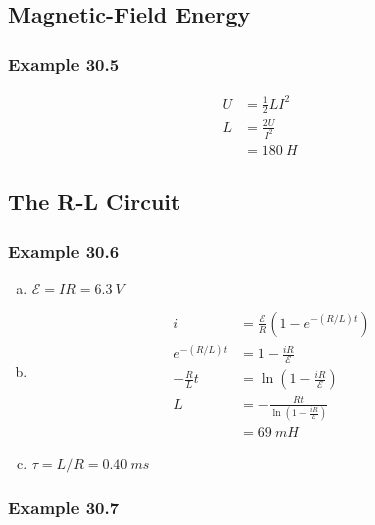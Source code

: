\documentclass{article}
\begin{document}
\subsection{Magnetic-Field Energy}

\subsubsection{Example 30.5}

\begin{align*}
  U & = \frac{1}{2} L I^2 \\
  L & = \frac{2 U}{I^2}   \\
    & = \qty{180}{H}
\end{align*}

\subsection{The R-L Circuit}

\subsubsection{Example 30.6}

\begin{enumerate}[(a)]
  \item $\mathcal{E} = I R = \qty{6.3}{V}$

  \item

        \begin{align*}
          i              & = \frac{\mathcal{E}}{R} (1 - e^{-(R / L) t})                  \\
          e^{-(R / L) t} & = 1 - \frac{i R}{\mathcal{E}}                                 \\
          -\frac{R}{L} t & = \ln \left( 1 - \frac{i R}{\mathcal{E}} \right)              \\
          L              & = -\frac{R t}{\ln \left( 1 - \frac{i R}{\mathcal{E}} \right)} \\
                         & = \qty{69}{mH}
        \end{align*}

  \item $\tau = L / R = \qty{0.40}{ms}$
\end{enumerate}

\subsubsection{Example 30.7}
\end{document}
